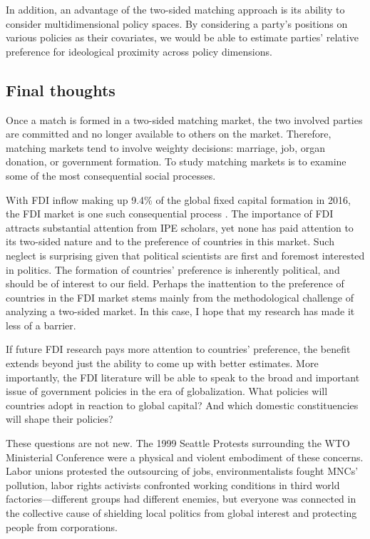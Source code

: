 In addition, an advantage of the two-sided matching approach is its ability to
consider multidimensional policy spaces. By considering a party's positions on
various policies as their covariates, we would be able to estimate parties'
relative preference for ideological proximity across policy dimensions.

\subsection{Final thoughts}

Once a match is formed in a two-sided matching market, the two involved parties
are committed and no longer available to others on the market. Therefore,
matching markets tend to involve weighty decisions: marriage, job, organ
donation, or government formation. To study matching markets is to examine some
of the most consequential social processes.

With FDI inflow making up 9.4\% of the global fixed capital formation in 2016,
the FDI market is one such consequential process \citep{UNCTAD2017}. The
importance of FDI attracts substantial attention from IPE scholars, yet none has
paid attention to its two-sided nature and to the preference of countries in
this market. Such neglect is surprising given that political scientists are
first and foremost interested in politics. The formation of countries'
preference is inherently political, and should be of interest to our field.
Perhaps the inattention to the preference of countries in the FDI market stems
mainly from the methodological challenge of analyzing a two-sided market. In
this case, I hope that my research has made it less of a barrier.

If future FDI research pays more attention to countries' preference, the benefit
extends beyond just the ability to come up with better estimates. More
importantly, the FDI literature will be able to speak to the broad and important
issue of government policies in the era of globalization. What policies will
countries adopt in reaction to global capital? And which domestic
constituencies will shape their policies?

These questions are not new. The 1999 Seattle Protests surrounding the WTO
Ministerial Conference were a physical and violent embodiment of these concerns.
Labor unions protested the outsourcing of jobs, environmentalists fought MNCs'
pollution, labor rights activists confronted working conditions in third world
factories---different groups had different enemies, but everyone was connected
in the collective cause of shielding local politics from global interest and
protecting people from corporations.

